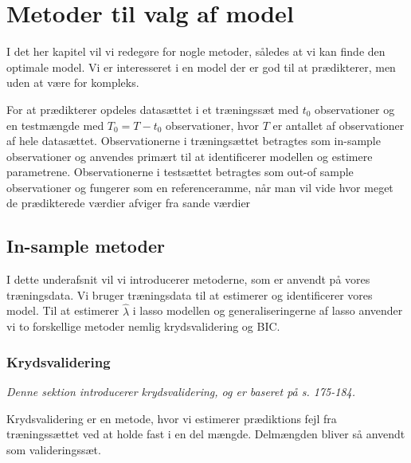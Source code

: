 \chapter{Metoder til valg af model}
I det her kapitel vil vi redegøre for nogle metoder, således at vi kan finde den optimale model.
Vi er interesseret i en model der er god til at prædikterer, men uden at være for kompleks.  

For at prædikterer opdeles datasættet i et træningssæt med $t_0$ observationer og en testmængde med $T_0 = T - t_0 $ observationer, hvor $T$ er antallet af observationer af hele datasættet. 
Observationerne i træningsættet betragtes som in-sample observationer og anvendes primært til at identificerer modellen og estimere parametrene. 
Observationerne i testsættet betragtes som out-of sample observationer og fungerer som en referenceramme, når man vil vide hvor meget de prædikterede værdier afviger fra sande værdier 
 
\section{In-sample metoder}
I dette underafsnit vil vi introducerer metoderne, som er anvendt på vores træningsdata. Vi bruger træningsdata til at estimerer og identificerer vores model. 
Til at estimerer $\widehat{\lambda}$ i lasso modellen og generaliseringerne af lasso anvender vi to forskellige metoder nemlig krydsvalidering og BIC. 

\subsection{Krydsvalidering}
\textit{Denne sektion introducerer krydsvalidering, og er baseret på \citep{james} s. 175-184. }

Krydsvalidering er en metode, hvor vi estimerer prædiktions fejl fra træningssættet ved at holde fast i en del mængde. Delmængden bliver så anvendt som valideringssæt. 


